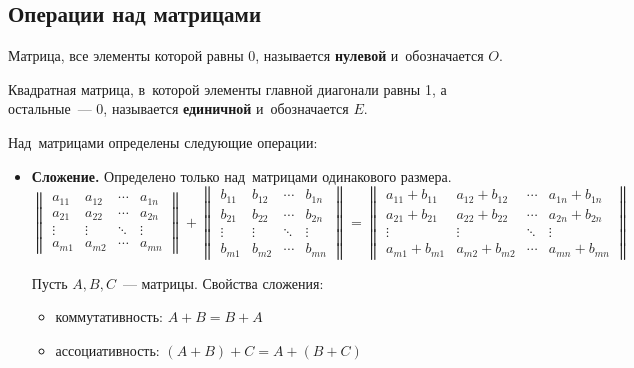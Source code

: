 \subsection{Операции над матрицами}
Матрица, все элементы которой равны 0, называется \textbf{нулевой} и~обозначается $O$.

Квадратная матрица, в~которой элементы главной диагонали равны 1, а остальные~--- 0, называется \textbf{единичной} и~обозначается $E$.

Над~матрицами определены следующие операции:
\begin{itemize}
	\item\textbf{Сложение.}
	Определено только над~матрицами одинакового размера.
	\begin{equation*}
	\begin{Vmatrix}
	a_{11} & a_{12} & \cdots & a_{1n} \\ 
	a_{21} & a_{22} & \cdots & a_{2n} \\ 
	\vdots & \vdots & \ddots & \vdots \\ 
	a_{m1} & a_{m2} & \cdots & a_{mn}
	\end{Vmatrix} +
	\begin{Vmatrix}
	b_{11} & b_{12} & \cdots & b_{1n} \\ 
	b_{21} & b_{22} & \cdots & b_{2n} \\ 
	\vdots & \vdots & \ddots & \vdots \\ 
	b_{m1} & b_{m2} & \cdots & b_{mn}
	\end{Vmatrix} =
	\begin{Vmatrix}
	a_{11} + b_{11} & a_{12} + b_{12} & \cdots & a_{1n} + b_{1n} \\ 
	a_{21} + b_{21} & a_{22} + b_{22} & \cdots & a_{2n} + b_{2n} \\ 
	\vdots & \vdots & \ddots & \vdots \\ 
	a_{m1} + b_{m1} & a_{m2} + b_{m2} & \cdots & a_{mn} + b_{mn}
	\end{Vmatrix}
	\end{equation*}
	
	Пусть $A, B, C$~--- матрицы. Свойства сложения:
	\begin{itemize}
		\item коммутативность:
		$A + B = B + A$
		\item ассоциативность:
		$(A + B) + C = A + (B + C)$
	\end{itemize}
	

\end{itemize}
